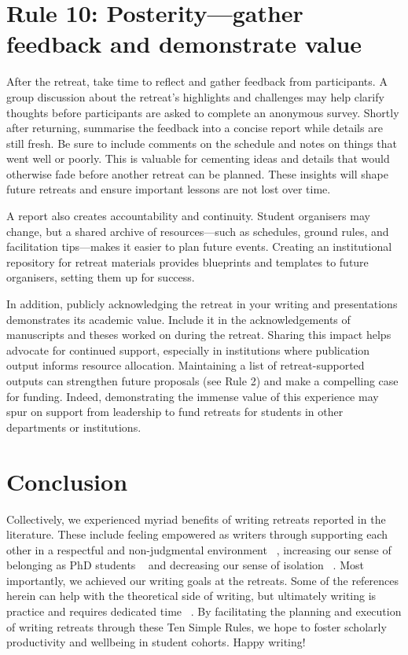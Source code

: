 \documentclass[10pt,letterpaper]{article}
\begin{document}
\section*{Rule 10: Posterity—gather feedback and demonstrate value}

After the retreat, take time to reflect and gather feedback from participants. A group discussion about the retreat's highlights and challenges may help clarify thoughts before participants are asked to complete an anonymous survey. Shortly after returning, summarise the feedback into a concise report while details are still fresh. Be sure to include comments on the schedule and notes on things that went well or poorly. This is valuable for cementing ideas and details that would otherwise fade before another retreat can be planned. These insights will shape future retreats and ensure important lessons are not lost over time.

A report also creates accountability and continuity. Student organisers may change, but a shared archive of resources---such as schedules, ground rules, and facilitation tips---makes it easier to plan future events. Creating an institutional repository for retreat materials provides blueprints and templates to future organisers, setting them up for success.

In addition, publicly acknowledging the retreat in your writing and presentations demonstrates its academic value. Include it in the acknowledgements of manuscripts and theses worked on during the retreat. Sharing this impact helps advocate for continued support, especially in institutions where publication output informs resource allocation. Maintaining a list of retreat-supported outputs can strengthen future proposals (see Rule 2) and make a compelling case for funding. Indeed, demonstrating the immense value of this experience may spur on support from leadership to fund retreats for students in other departments or institutions.

\section*{Conclusion}

Collectively, we experienced myriad benefits of writing retreats reported in the literature. These include feeling empowered as writers through supporting each other in a respectful and non-judgmental environment ~\cite{papen2018}, increasing our sense of belonging as PhD students ~\cite{omeara2017} and decreasing our sense of isolation ~\cite{eardley2021}. Most importantly, we achieved our writing goals at the retreats. Some of the references herein can help with the theoretical side of writing, but ultimately writing is practice and requires dedicated time ~\cite{peterson2018, grogan2021}. By facilitating the planning and execution of writing retreats through these Ten Simple Rules, we hope to foster scholarly productivity and wellbeing in student cohorts. Happy writing!
\end{document}
